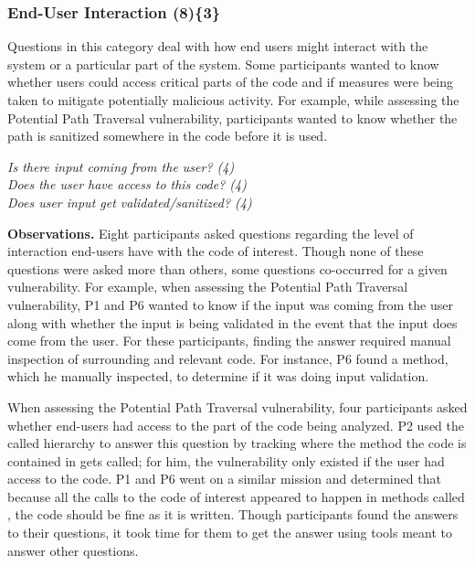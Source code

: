\documentclass{acm_proc_article-sp}
\begin{document}



\subsubsection{\textbf{End-User Interaction (8)\{3\}}}
\label{eui}

Questions in this category deal with how end users might interact with the system or a particular part of the system. 
Some participants wanted to know whether users could access critical parts of the code and if measures were being taken to mitigate potentially malicious activity. 
For example, while assessing the Potential Path Traversal vulnerability, participants wanted to know whether the path is sanitized somewhere in the code before it is used.


\noindent\emph{Is there input coming from the user? (4)} \\
\emph{Does the user have access to this code? (4)} \\
\emph{Does user input get validated/sanitized? (4)} 


\noindent\textbf{Observations.}
Eight participants asked questions regarding the level of interaction end-users have with the code of interest. 
Though none of these questions were asked more than others, some questions co-occurred for a given vulnerability.
For example, when assessing the Potential Path Traversal vulnerability, P1 and P6 wanted to know if the input was coming from the user along with whether the input is being validated in the event that the input does come from the user.
For these participants, finding the answer required manual inspection of surrounding and relevant code. 
For instance, P6 found a  method, which he manually inspected, to determine if it was doing input validation.

When assessing the Potential Path Traversal vulnerability, four participants asked whether end-users had access to the part of the code being analyzed.
P2 used the called hierarchy to answer this question by tracking where the method the code is contained in gets called; for him, the vulnerability only existed if the user had access to the code.
P1 and P6 went on a similar mission and determined that because all the calls to the code of interest appeared to happen in methods called , the code should be fine as it is written.
Though participants found the answers to their questions, it took time for them to get the answer using tools meant to answer other questions.
\end{document}
